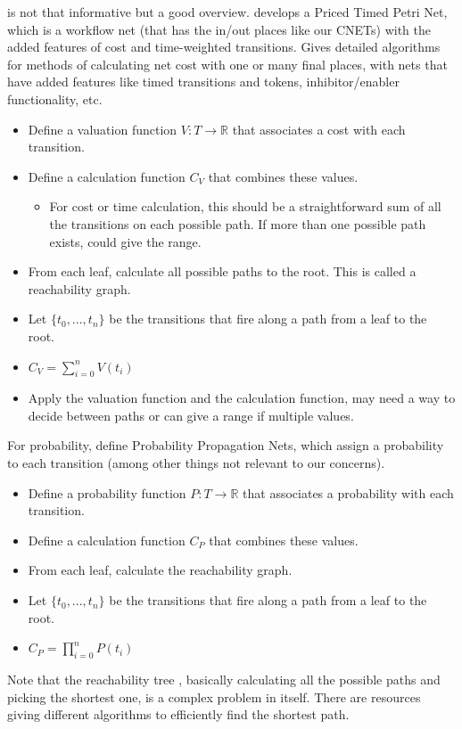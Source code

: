  \cite{ZIMMERMANN2008} is not that informative but a good overview.
\cite{10.1007/978-3-642-00596-1_25} develops a Priced Timed Petri Net, which is a workflow net (that has the in/out places like our CNETs) with the added features of cost and time-weighted transitions. Gives detailed algorithms for methods of calculating net cost with one or many final places, with nets that have added features like timed transitions and tokens, inhibitor/enabler functionality, etc. 
\begin{itemize}
\item Define a valuation function $V: T \rightarrow \mathbb {R}$ that associates a cost with each transition.
\item Define a calculation function $C_V$ that combines these values. 
\begin{itemize}
\item For cost or time calculation, this should be a straightforward sum of all the transitions on each possible path. If more than one possible path exists, could give the range. 
\end{itemize}
\item From each leaf, calculate all possible paths to the root. This is called a reachability graph.
\item Let $\{t_0, ..., t_n\}$ be the transitions that fire along a path from a leaf to the root.
\item $C_V = \sum_{i=0}^{n} V(t_i)$
\item Apply the valuation function and the calculation function, may need a way to decide between paths or can give a range if multiple values.
\end{itemize}

For probability, \cite{Lautenbach} define Probability Propagation Nets, which assign a probability to each transition (among other things not relevant to our concerns).
\begin{itemize}
\item Define a probability function $P: T \rightarrow \mathbb {R}$ that associates a probability with each transition.
\item Define a calculation function $C_P$ that combines these values. 
\item From each leaf, calculate the reachability graph.
\item Let $\{t_0, ..., t_n\}$ be the transitions that fire along a path from a leaf to the root.
\item $C_P = \prod_{i=0}^{n} P(t_i)$
\end{itemize}
Note that the reachability tree , basically calculating all the possible paths and picking the shortest one, is a complex problem in itself. There are resources giving different algorithms to efficiently find the shortest path.
\cite{LOPES201467} 